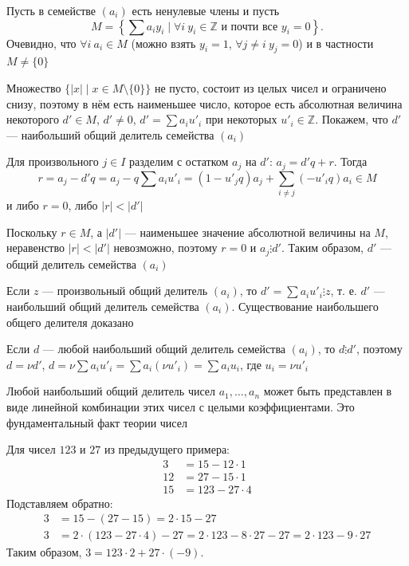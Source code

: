 \documentclass[a4paper,12pt]{article}
\theoremstyle{definition}
\theoremstyle{plain}
\theoremstyle{remark}
\begin{document}
	Пусть в семействе $(a_i)$ есть ненулевые члены и пусть
	\[
	M = \left\{ \sum a_i y_i \mid \forall i \ y_i \in \mathbb{Z} \text{ и почти все } y_i = 0 \right\}.
	\]
	Очевидно, что $\forall i \ a_i \in M$ (можно взять $y_i = 1$, $\forall j \neq i \ y_j = 0$) и в частности $M \neq \{0\}$
	
	Множество $\{|x| \mid x \in M \setminus \{0\}\}$ не пусто, состоит из целых чисел и ограничено снизу, поэтому в нём есть наименьшее число, которое есть абсолютная величина некоторого $d' \in M$, $d' \neq 0$, $d' = \sum a_i u'_i$ при некоторых $u'_i \in \mathbb{Z}$. Покажем, что $d'$ — наибольший общий делитель семейства $(a_i)$
	
	Для произвольного $j \in I$ разделим с остатком $a_j$ на $d'$: $a_j = d' q + r$. Тогда
	\[
	r = a_j - d' q = a_j - q \sum a_i u'_i = (1 - u'_j q) a_j + \sum_{i \neq j} (-u'_i q) a_i \in M
	\]
	и либо $r = 0$, либо $|r| < |d'|$
	
	Поскольку $r \in M$, а $|d'|$ — наименьшее значение абсолютной величины на $M$, неравенство $|r| < |d'|$ невозможно, поэтому $r = 0$ и $a_j \vdots d'$. Таким образом, $d'$ — общий делитель семейства $(a_i)$

	Если $z$ — произвольный общий делитель $(a_i)$, то $d' = \sum a_i u'_i \vdots z$, т. е. $d'$ — наибольший общий делитель семейства $(a_i)$. Существование наибольшего общего делителя доказано
	
	Если $d$ — любой наибольший общий делитель семейства $(a_i)$, то $d \vdots d'$, поэтому $d = \nu d'$, $d = \nu \sum a_i u'_i = \sum a_i (\nu u'_i) = \sum a_i u_i$, где $u_i = \nu u'_i$
	
	\begin{tcolorbox}[colback=red!5, colframe=red!70!black, title=Итог теоремы]
	Любой наибольший общий делитель чисел $a_1, \dots, a_n$ может быть представлен в виде линейной комбинации этих чисел с целыми коэффициентами. Это фундаментальный факт теории чисел
	\end{tcolorbox}
	
	\begin{tcolorbox}[colback=blue!5, colframe=blue!40!black, title=Пример линейного представления]
	Для чисел $123$ и $27$ из предыдущего примера:
	\begin{align*}
	3 &= 15 - 12 \cdot 1 \\
	12 &= 27 - 15 \cdot 1 \\
	15 &= 123 - 27 \cdot 4
	\end{align*}
	Подставляем обратно:
	\begin{align*}
	3 &= 15 - (27 - 15) = 2 \cdot 15 - 27 \\
	3 &= 2 \cdot (123 - 27 \cdot 4) - 27 = 2 \cdot 123 - 8 \cdot 27 - 27 = 2 \cdot 123 - 9 \cdot 27
	\end{align*}
	Таким образом, $3 = 123 \cdot 2 + 27 \cdot (-9)$.
	\end{tcolorbox}
	
\end{document}
